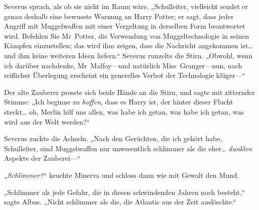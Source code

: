 Severus sprach, als ob sie nicht im Raum wäre. „Schulleiter, vielleicht sendet er genau deshalb eine bewusste Warnung an Harry Potter; er sagt, dass jeder Angriff mit Muggelwaffen mit einer Vergeltung in derselben Form beantwortet wird. Befehlen Sie Mr~Potter, die Verwendung von Muggeltechnologie in seinen Kämpfen einzustellen; das wird ihm zeigen, dass die Nachricht angekommen ist… und ihm keine weiteren Ideen liefern.“ Severus runzelte die Stirn. „Obwohl, wenn ich darüber nachdenke, Mr~Malfoy—und natürlich Miss~Granger—nun, nach reiflicher Überlegung erscheint ein generelles Verbot der Technologie klüger—“

Der alte Zauberer presste sich beide Hände an die Stirn, und sagte mit zitternder Stimme: „Ich beginne zu \emph{hoffen}, dass es Harry ist, der hinter dieser Flucht steckt… oh, Merlin hilf uns allen, was habe ich getan, was habe ich getan, was wird aus der Welt werden?“

Severus zuckte die Achseln. „Nach den Gerüchten, die ich gehört habe, Schulleiter, sind Muggelwaffen nur unwesentlich schlimmer als die eher… \emph{dunklen} Aspekte der Zauberei—“

„\emph{Schlimmer?}“ keuchte Minerva und schloss dann wie mit Gewalt den Mund.

„Schlimmer als jede Gefahr, die in diesen schwindenden Jahren noch besteht,“ sagte Albus. „Nicht schlimmer als die, die Atlantis aus der Zeit auslöschte.“

